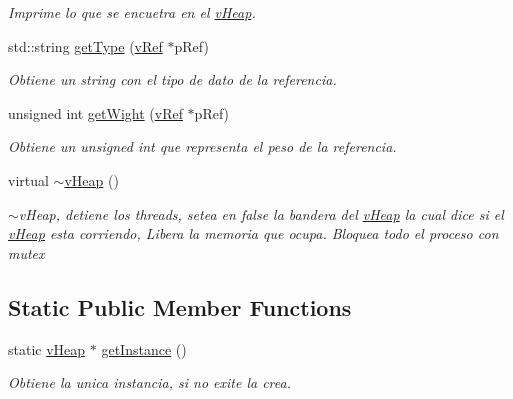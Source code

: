 \begin{DoxyCompactItemize}
\begin{DoxyCompactList}\small\item\em Imprime lo que se encuetra en el \hyperlink{classv_heap}{v\-Heap}. \end{DoxyCompactList}\item 
std\-::string \hyperlink{classv_heap_af6967e0e004d4ae78c88363878ae96a3}{get\-Type} (\hyperlink{classv_ref}{v\-Ref} $\ast$p\-Ref)
\begin{DoxyCompactList}\small\item\em Obtiene un string con el tipo de dato de la referencia. \end{DoxyCompactList}\item 
unsigned int \hyperlink{classv_heap_ae9f9f3ed79f45beb7b47e88a590fac61}{get\-Wight} (\hyperlink{classv_ref}{v\-Ref} $\ast$p\-Ref)
\begin{DoxyCompactList}\small\item\em Obtiene un unsigned int que representa el peso de la referencia. \end{DoxyCompactList}\item 
\hypertarget{classv_heap_a8bbcf6e79d6d28f16a1de164619e04ef}{virtual \hyperlink{classv_heap_a8bbcf6e79d6d28f16a1de164619e04ef}{$\sim$v\-Heap} ()}\label{classv_heap_a8bbcf6e79d6d28f16a1de164619e04ef}

\begin{DoxyCompactList}\small\item\em $\sim$v\-Heap, detiene los threads, setea en false la bandera del \hyperlink{classv_heap}{v\-Heap} la cual dice si el \hyperlink{classv_heap}{v\-Heap} esta corriendo, Libera la memoria que ocupa. Bloquea todo el proceso con mutex \end{DoxyCompactList}\end{DoxyCompactItemize}
\subsection*{Static Public Member Functions}
\begin{DoxyCompactItemize}
\item 
static \hyperlink{classv_heap}{v\-Heap} $\ast$ \hyperlink{classv_heap_a1b50fb6f333ab744a080647f689f3de9}{get\-Instance} ()
\begin{DoxyCompactList}\small\item\em Obtiene la unica instancia, si no exite la crea. \end{DoxyCompactList}\end{DoxyCompactItemize}
